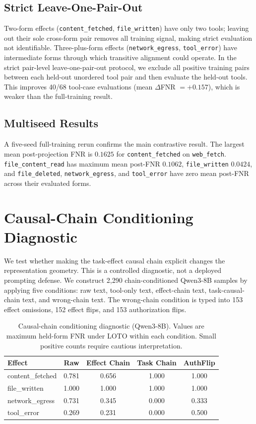 \documentclass{article}
\begin{document}
\subsection{Strict Leave-One-Pair-Out}

Two-form effects (\texttt{content\_fetched}, \texttt{file\_written}) have only two tools; leaving out their sole cross-form pair removes all training signal, making strict evaluation not identifiable. Three-plus-form effects (\texttt{network\_egress}, \texttt{tool\_error}) have intermediate forms through which transitive alignment could operate. In the strict pair-level leave-one-pair-out protocol, we exclude all positive training pairs between each held-out unordered tool pair and then evaluate the held-out tools. This improves 40/68 tool-case evaluations (mean $\Delta$FNR $=+0.157$), which is weaker than the full-training result.

\subsection{Multiseed Results}

A five-seed full-training rerun confirms the main contrastive result. The largest mean post-projection FNR is $0.1625$ for \texttt{content\_fetched} on \texttt{web\_fetch}. \texttt{file\_content\_read} has maximum mean post-FNR $0.1062$, \texttt{file\_written} $0.0424$, and \texttt{file\_deleted}, \texttt{network\_egress}, and \texttt{tool\_error} have zero mean post-FNR across their evaluated forms.

\section{Causal-Chain Conditioning Diagnostic}

We test whether making the task-effect causal chain explicit changes the representation geometry. This is a controlled diagnostic, not a deployed prompting defense. We construct 2,290 chain-conditioned Qwen3-8B samples by applying five conditions: raw text, tool-only text, effect-chain text, task-causal-chain text, and wrong-chain text. The wrong-chain condition is typed into 153 effect omissions, 152 effect flips, and 153 authorization flips.

\begin{table}[h]
\centering
\caption{Causal-chain conditioning diagnostic (Qwen3-8B). Values are maximum held-form FNR under LOTO within each condition. Small positive counts require cautious interpretation.}
\label{tab:causalchain}
\begin{tabular}{lcccc}
\toprule
Effect & Raw & Effect Chain & Task Chain & AuthFlip \\
\midrule
content\_fetched & 0.781 & 0.656 & 1.000 & 1.000 \\
file\_written & 1.000 & 1.000 & 1.000 & 1.000 \\
network\_egress & 0.731 & 0.345 & 0.000 & 0.333 \\
tool\_error & 0.269 & 0.231 & 0.000 & 0.500 \\
\bottomrule
\end{tabular}
\end{table}
\end{document}
